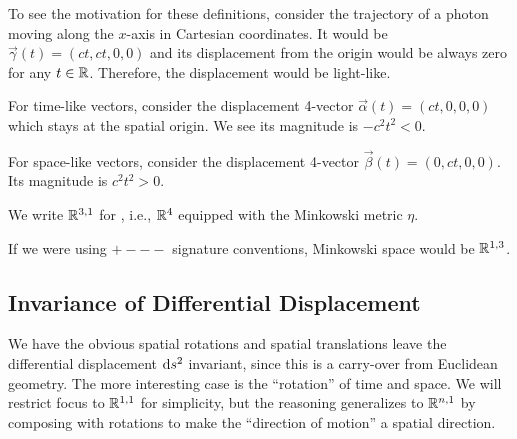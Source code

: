 \begin{remark}
To see the motivation for these definitions, consider the trajectory of
a photon moving along the $x$-axis in Cartesian coordinates. It would be
$\vec{\gamma}(t)=(ct,ct,0,0)$ and its displacement from the origin would
be always zero for any $t\in\mathbb{R}$. Therefore, the displacement would be
light-like.

For time-like vectors, consider the displacement 4-vector
$\vec{\alpha}(t)=(ct,0,0,0)$ which stays at the spatial origin. We see
its magnitude is $-c^{2}t^{2}<0$.

For space-like vectors, consider the displacement 4-vector
$\vec{\beta}(t)=(0,ct,0,0)$. Its magnitude is $c^{2}t^{2}>0$.
\end{remark}

\begin{definition}
We write $\mathbb{R}^{3,1}$ for , i.e., $\mathbb{R}^{4}$
equipped with the Minkowski metric $\eta$.
\end{definition}

\begin{remark}
If we were using $+---$ signature conventions, Minkowski space would be
$\mathbb{R}^{1,3}$. 
\end{remark}

\subsection{Invariance of Differential Displacement}

\M We have the obvious spatial rotations and spatial translations leave
the differential displacement $\mathrm{d} s^{2}$ invariant, since this is a
carry-over from Euclidean geometry. The more interesting case is the
``rotation'' of time and space. We will restrict focus to $\mathbb{R}^{1,1}$
for simplicity, but the reasoning generalizes to $\mathbb{R}^{n,1}$ by
composing with rotations to make the ``direction of motion'' a spatial
direction.

